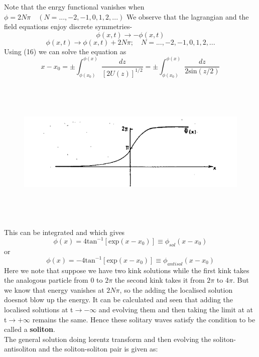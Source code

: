\documentclass[a4paper, 12pt]{article}
\begin{document}
Note that the enrgy functional vanishes when $\phi=2N\pi\quad (N=...,-2,-1,0,1,2,...)$
We observe that the lagrangian and the field equations enjoy discrete symmetries-
$$\phi(x,t) \to -\phi(x,t)$$
 \begin{equation}%
\phi(x,t) \to \phi(x,t)+2N\pi;\quad N=...,-2,-1,0,1,2,...
\end{equation}
Using (16) we can solve the equation as
 \begin{equation}%
 x - x_0 = \pm \int_{\phi(x_0)}^{\phi(x)}\frac{dz}{[2U(z)]^{1/2}} = \pm \int_{\phi(x_0)}^{\phi(x)}\frac{dz}{2\textrm{sin}(z/2)}
 \end{equation}
  \begin{figure}[ht]
    \centering
    \includegraphics[height=7cm, width=12cm]{fig6}
   \end{figure}
This can be integrated and which gives
 \begin{equation}%
\phi(x)=4\textrm{tan}^{-1}[\textrm{exp}(x-x_0)] \equiv \phi_{sol}(x-x_0)
 \end{equation}
 or
  \begin{equation}%
\phi(x)=-4 \textrm{tan}^{-1}[\textrm{exp}(x-x_0)] \equiv \phi_{antisol}(x-x_0)
 \end{equation}
 Here we note that suppose we have two kink solutions while the first kink takes the analogous particle from 0 to $2\pi$ the second kink takes it from $2\pi$ to $4\pi$. But we know that energy vanishes at $2N\pi$, so the adding the localised solution doesnot blow up the energy. It can be calculated and seen that adding the localised solutions at t$\to -\infty$ and evolving them and then taking the limit at at t$\to +\infty$ remains the same. Hence these solitary waves satisfy the condition to be called a \textbf{soliton}.\\
 The general solution doing lorentz transform and then evolving the soliton-antisoliton and the soliton-soliton pair is given as:
\end{document}
